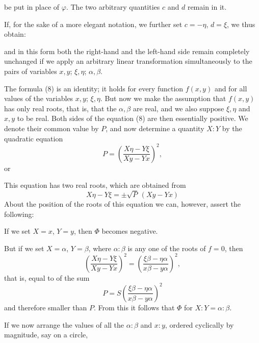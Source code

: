 be put in place of $\varphi$. The two arbitrary quantities $c$ and $d$
remain in it.

If, for the sake of a more elegant notation, we further set $c = -\eta$,
$d = \xi$, we thus obtain:


and in this form both the right-hand and the left-hand side remain
completely unchanged if we apply an arbitrary linear transformation
simultaneously to the pairs of variables $x, y$; $\xi, \eta$; $\alpha, \beta$.

The formula (8) is an identity; it holds for every function
$f(x, y)$ and for all values of the variables $x, y$; $\xi, \eta$. But now
we make the assumption that $f(x, y)$ has only real roots, that is,
that the $\alpha, \beta$ are real, and we also suppose $\xi, \eta$ and
$x, y$ to be real. Both sides of the equation (8) are then
essentially positive. We denote their common value by
$P$, and now determine a quantity $X:Y$ by the quadratic
equation
\[
P = \left(\frac{X\eta - Y\xi}{Xy - Yx}\right)^2,
\]
or


This equation has two real roots, which are obtained from
\[
X\eta - Y\xi = \pm \sqrt{P}\,(Xy - Yx)
\]
About the position of the roots of this equation we can, however,
assert the following:

If we set $X = x$, $Y = y$, then $\Phi$ becomes negative.

But if we set $X = \alpha$, $Y = \beta$, where $\alpha:\beta$ is any one
of the roots of $f = 0$, then
\[
\left(\frac{X\eta - Y\xi}{Xy - Yx}\right)^2 = \left(\frac{\xi\beta - \eta\alpha}{x\beta - y\alpha}\right)^2,
\]
that is, equal to  of the sum
\[
P = S\left(\frac{\xi\beta - \eta\alpha}{x\beta - y\alpha}\right)^2
\]
and therefore smaller than $P$. From this it follows that $\Phi$  for $X:Y = \alpha:\beta$.

If we now arrange the values of all the $\alpha:\beta$ and $x:y$,
ordered cyclically by magnitude, say on a circle,
